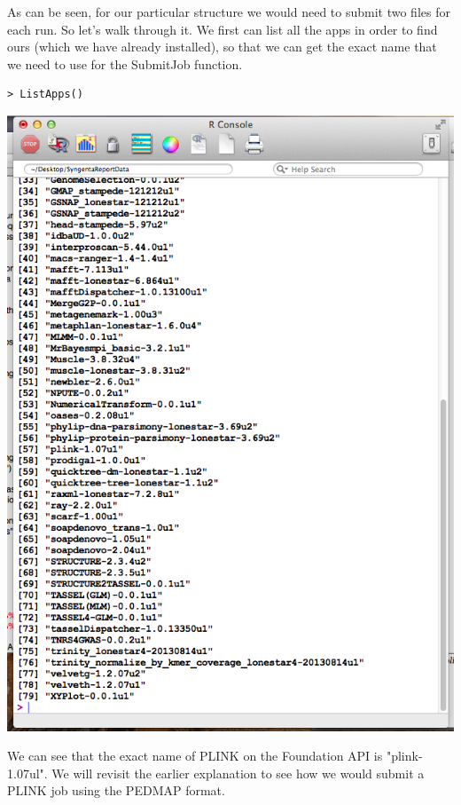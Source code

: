 \documentclass[twoside,a4paper]{refart}
\begin{document}
As can be seen, for our particular structure we would need to submit two files for each run. So let's walk through it. We first can list all the apps in order to find ours (which we have already installed), so that we can get the exact name that we need to use for the SubmitJob function.

\begin{center}
\begin{lstlisting}[frame=single]
> ListApps()
\end{lstlisting}
\end{center}

\begin{center}
	\includegraphics[width=\textwidth]{doc_step1_3}
\end{center}

We can see that the exact name of PLINK on the Foundation API is "plink-1.07ul". We will revisit the earlier explanation to see how we would submit a PLINK job using the PEDMAP format.
\end{document}
